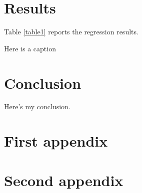 \documentclass{article}
\begin{document}
\section{Results}
Table \ref{table1} reports the regression results.

\begin{table}[!htbp] \centering 
		
	\caption{Here is a caption} \label{table1} 
\end{table}


\section{Conclusion} \label{secconclusion}
Here's my conclusion.





\begin{appendices}

	\section{First appendix} \label{appendix1}
	
	\section{Second appendix} \label{appendix2}

\end{appendices}
\end{document}
